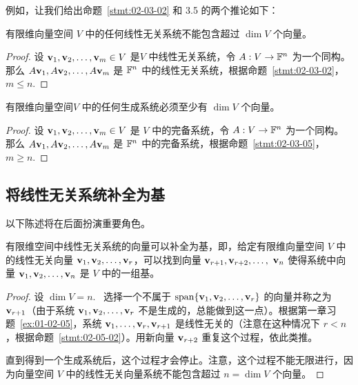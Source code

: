 例如，让我们给出命题~\ref{stmt:02-03-02} 和 3.5 的两个推论如下：

\begin{proposition}\label{stmt:02-05-02}
有限维向量空间 $V$ 中的任何线性无关系统不能包含超过 $\dim V$ 个向量。
\end{proposition}

\begin{proof} 设 $\mathbf{v}_1, \mathbf{v}_2, \dots, \mathbf{v}_m \in V$ 是$V$ 中线性无关系统，令 $A: V \to \mathbb{F}^n$ 为一个同构。那么 $A \mathbf{v}_1, A \mathbf{v}_2, \dots, A \mathbf{v}_m$ 是 $\mathbb{F}^n$ 中的线性无关系统，根据命题~\ref{stmt:02-03-02}， $m \le n$.\end{proof}


\begin{proposition}\label{stmt:02-05-03}
有限维向量空间$V$ 中的任何生成系统必须至少有 $\dim V$ 个向量。
\end{proposition}

\begin{proof} 设 $\mathbf{v}_1, \mathbf{v}_2, \dots, \mathbf{v}_m \in V$ 是 $V$ 中的完备系统，令 $A: V \to \mathbb{F}^n$ 为一个同构。
那么 $A \mathbf{v}_1, A \mathbf{v}_2, \dots, A \mathbf{v}_m$ 是 $\mathbb{F}^n$ 中的完备系统，根据命题~\ref{stmt:02-03-05}， $m \geq n$.\end{proof}



\subsection{将线性无关系统补全为基}\label{sec:02-05-01}

以下陈述将在后面扮演重要角色。

\begin{proposition}\label{stmt:02-05-04}
有限维空间中线性无关系统的向量可以补全为基，即，给定有限维向量空间 $V$ 中的线性无关向量 $\mathbf{v}_1, \mathbf{v}_2, \dots, \mathbf{v}_r$，可以找到向量 $\mathbf{v}_{r+1}, \mathbf{v}_{r+2}, \dots, $ $\mathbf{v}_n$ 使得系统中向量 $\mathbf{v}_1, \mathbf{v}_2, \dots, \mathbf{v}_n$ 是 $V$ 中的一组基。
\end{proposition}

\begin{proof} 设 $\dim V = n$. ~选择一个不属于 $\operatorname{span}\{\mathbf{v}_1, \mathbf{v}_2, \dots, \mathbf{v}_r\}$ 的向量并称之为 $\mathbf{v}_{r+1}$（由于系统 $\mathbf{v}_1, \mathbf{v}_2, \dots, \mathbf{v}_r$ 不是生成的，总能做到这一点）。根据第一章习题~\ref{ex:01-02-05}，系统 $\mathbf{v}_1, \dots, \mathbf{v}_r, \mathbf{v}_{r+1}$ 是线性无关的（注意在这种情况下 $r < n$，根据命题~\ref{stmt:02-05-02}）。用新向量 $\mathbf{v}_{r+2}$ 重复这个过程，依此类推。

直到得到一个生成系统后，这个过程才会停止。注意，这个过程不能无限进行，因为向量空间 $V$ 中的线性无关向量系统不能包含超过 $n = \dim V$ 个向量。\end{proof}

